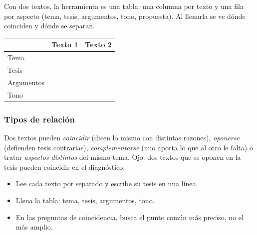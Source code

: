 

Con dos textos, la herramienta es una tabla: una columna por texto y una fila por aspecto (tema, tesis, argumentos, tono,
propuesta). Al llenarla se ve dónde coinciden y dónde se separan.

\begin{center}\small
\begin{tabular}{@{}l|p{40mm}|p{40mm}@{}}
\toprule
 & \textbf{Texto 1} & \textbf{Texto 2}\\\midrule
Tema & & \\
Tesis & & \\
Argumentos & & \\
Tono & & \\\bottomrule
\end{tabular}
\end{center}

\subsubsection{Tipos de relación}
Dos textos pueden \emph{coincidir} (dicen lo mismo con distintas razones), \emph{oponerse} (defienden tesis contrarias),
\emph{complementarse} (uno aporta lo que al otro le falta) o tratar \emph{aspectos distintos} del mismo tema. Ojo: dos
textos que se oponen en la tesis pueden coincidir en el diagnóstico.


\begin{regla}
\begin{itemize}
  \item Lee cada texto por separado y escribe su tesis en una línea.
  \item Llena la tabla: tema, tesis, argumentos, tono.
  \item En las preguntas de coincidencia, busca el punto común más preciso, no el más amplio.
\end{itemize}
\end{regla}

